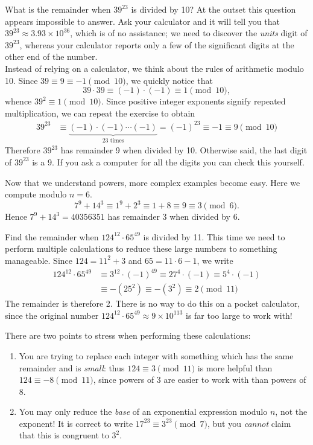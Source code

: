 \begin{examples}
	\item What is the remainder when $39^{23}$ is divided by 10? At the outset this question appears impossible to answer. Ask your calculator and it will tell you that $39^{23}\approx 3.93\times 10^{36}$, which is of no assistance; we need to discover the \emph{units} digit of $39^{23}$, whereas your calculator reports only a few of the significant digits at the other end of the number.\\
	Instead of relying on a calculator, we think about the rules of arithmetic modulo 10. Since $39\equiv 9\equiv -1\pmod{10}$, we quickly notice that
	\[39\cdot 39\equiv (-1)\cdot(-1)\equiv 1\pmod{10},\]
	whence $39^2\equiv 1\pmod{10}$. Since positive integer exponents signify repeated multiplication, we can repeat the exercise to obtain
	\begin{align*}
	39^{23}&\equiv \underbrace{(-1)\cdot(-1)\cdots(-1)}_{\text{23 times}}=(-1)^{23}\equiv -1\equiv 9\pmod{10}
	\end{align*}
	Therefore $39^{23}$ has remainder 9 when divided by 10. Otherwise said, the last digit of $39^{23}$ is a 9. If you ask a computer for all  the digits you can check this yourself.
  \item Now that we understand powers, more complex examples become easy. Here we compute modulo $n=6$.
  \[7^9+14^3\equiv 1^9+2^3\equiv 1+8\equiv 9\equiv 3\pmod 6.\]
  Hence $7^9+14^3=40356351$ has remainder 3 when divided by 6.
  \item Find the remainder when $124^{12}\cdot 65^{49}$ is divided by 11. This time we need to perform multiple calculations to reduce these large numbers to something manageable. Since $124=11^2+3$ and $65=11\cdot 6-1$, we write
  \begin{align*}
  124^{12}\cdot 65^{49}&\equiv 3^{12}\cdot(-1)^{49}\equiv 27^4\cdot(-1)\equiv 5^4\cdot(-1)\\
  &\equiv -(25^2)\equiv -(3^2)\equiv 2\pmod{11}
  \end{align*}
  The remainder is therefore 2. There is no way to do this on a pocket calculator, since the original number $124^{12}\cdot 65^{49}\approx 9\times 10^{113}$ is far too large to work with!
\end{examples}

\noindent There are two points to stress when performing these calculations:
\begin{enumerate}
  \item You are trying to replace each integer with something which has the same remainder and is \emph{small}: thus $124\equiv 3\pmod{11}$ is more helpful than $124\equiv -8\pmod{11}$, since powers of 3 are easier to work with than powers of 8.
  \item You may only reduce the \emph{base} of an exponential expression modulo $n$, not the exponent! It is correct to write $17^{23}\equiv 3^{23}\pmod 7$, but you \emph{cannot} claim that this is congruent to $3^2$.
\end{enumerate}


